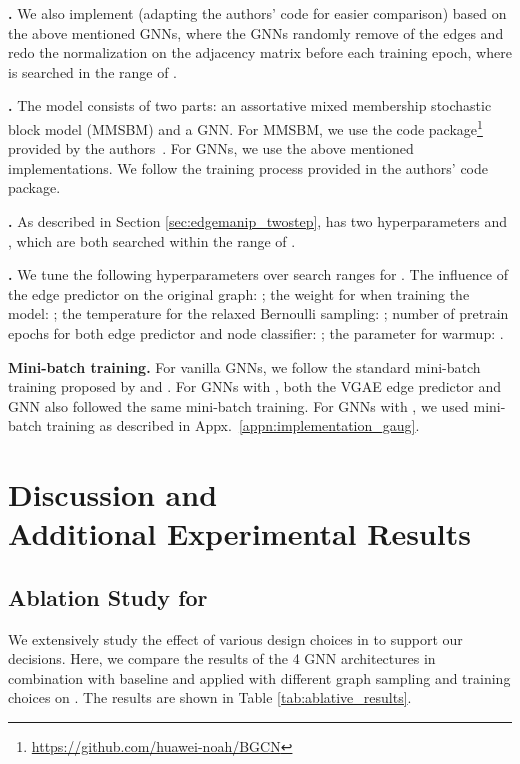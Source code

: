 \documentclass[letterpaper]{article} \usepackage{aaai21}  \usepackage{times}  \usepackage{helvet} \usepackage{courier}  \usepackage[hyphens]{url}  \usepackage{graphicx} \urlstyle{rm} \def\UrlFont{\rm}  \usepackage{natbib}  \usepackage{caption} \frenchspacing  \setlength{\pdfpagewidth}{8.5in}  \setlength{\pdfpageheight}{11in}
\begin{document}
\noindent \textbf{\dropedge.} We also implement \dropedge \cite{rong2019dropedge} (adapting the authors' code for easier comparison) based on the above mentioned GNNs, where the GNNs randomly remove  of the edges and redo the normalization on the adjacency matrix before each training epoch, where  is searched in the range of .  

\noindent \textbf{\bgcn.}
The \bgcn model consists of two parts: an assortative mixed membership stochastic block model (MMSBM) and a GNN. For MMSBM, we use the code package\footnote{\url{https://github.com/huawei-noah/BGCN}} provided by the authors~\cite{zhang2019bayesian}. For GNNs, we use the above mentioned implementations. We follow the training process provided in the authors' code package. 



\noindent \textbf{\methodtwo.} As described in Section \ref{sec:edgemanip_twostep}, \methodtwo has two hyperparameters  and , which are both searched within the range of .

\noindent \textbf{\method.} We tune the following hyperparameters over search ranges for \method. The influence of the edge predictor on the original graph: ; the weight for  when training the model: ; the temperature for the relaxed Bernoulli sampling: ; number of pretrain epochs for both edge predictor and node classifier: ; the parameter for warmup: .

\noindent \textbf{Mini-batch training.} For vanilla GNNs, we follow the standard mini-batch training proposed by \citet{hamilton2017inductive} and \citet{ying2018graph}. For GNNs with \methodtwo, both the VGAE edge predictor and GNN also followed the same mini-batch training. For GNNs with \method, we used mini-batch training as described in Appx.~\ref{appn:implementation_gaug}.

\section{Discussion and \\ Additional Experimental Results}
\label{appn:discussion}

\subsection{Ablation Study for \method}
\label{sec:ablation}
We extensively study the effect of various design choices in \method to support our decisions. Here, we compare the results of the 4 GNN architectures in combination with baseline and \method applied with different graph sampling and training choices on \cora.  The results are shown in Table \ref{tab:ablative_results}. 
\end{document}
